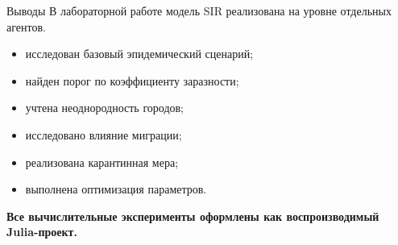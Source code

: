 \documentclass[
  10pt,
  ignorenonframetext,
  aspectratio=169,
  russian,
]{beamer}
\providecommand{\tightlist}{%
  \setlength{\itemsep}{0pt}\setlength{\parskip}{0pt}}
\begin{document}
\begin{frame}{Выводы}
\protect{}\label{ux432ux44bux432ux43eux434ux44b}
В лабораторной работе модель SIR реализована на уровне отдельных
агентов.

\begin{itemize}
\tightlist
\item
  исследован базовый эпидемический сценарий;
\item
  найден порог по коэффициенту заразности;
\item
  учтена неоднородность городов;
\item
  исследовано влияние миграции;
\item
  реализована карантинная мера;
\item
  выполнена оптимизация параметров.
\end{itemize}

\textbf{Все вычислительные эксперименты оформлены как воспроизводимый
Julia-проект.}
\end{frame}
\end{document}
